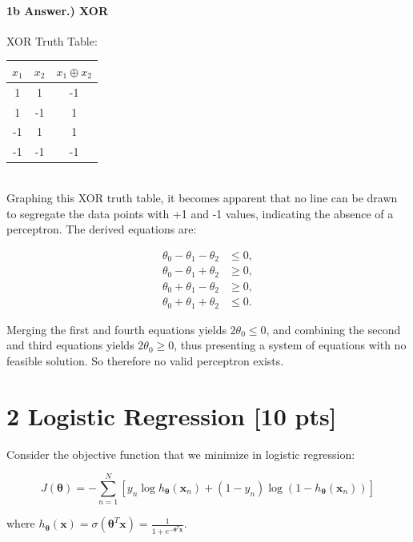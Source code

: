 \documentclass[10pt]{article}
\begin{document}
\paragraph{1b Answer.) XOR}
\hspace{1cm}

XOR Truth Table:\\
\begin{tabular}{cc|c}
$x_1$ & $x_2$ & $x_1 \oplus x_2$ \\ \hline
1 & 1 & -1 \\
1 & -1 & 1 \\
-1 & 1 & 1 \\
-1 & -1 & -1 \\
\end{tabular}\\

Graphing this XOR truth table, it becomes apparent that no line can be drawn to segregate the data points with +1 and -1 values, indicating the absence of a perceptron. The derived equations are:

\[
\begin{aligned}
\theta_0 - \theta_1 - \theta_2 &\leq 0, \\
\theta_0 - \theta_1 + \theta_2 &\geq 0, \\
\theta_0 + \theta_1 - \theta_2 &\geq 0, \\
\theta_0 + \theta_1 + \theta_2 &\leq 0.
\end{aligned}
\]

Merging the first and fourth equations yields \(2\theta_0 \leq 0\), and combining the second and third equations yields \(2\theta_0 \geq 0\), thus presenting a system of equations with no feasible solution. So therefore no valid perceptron exists.



\section*{2 Logistic Regression [10 pts]}
Consider the objective function that we minimize in logistic regression:

$$
J(\boldsymbol{\theta})=-\sum_{n=1}^{N}\left[y_{n} \log h_{\boldsymbol{\theta}}\left(\boldsymbol{x}_{n}\right)+\left(1-y_{n}\right) \log \left(1-h_{\boldsymbol{\theta}}\left(\boldsymbol{x}_{n}\right)\right)\right]
$$

where $h_{\boldsymbol{\theta}}(\boldsymbol{x})=\sigma\left(\boldsymbol{\theta}^{T} \boldsymbol{x}\right)=\frac{1}{1+e^{-\boldsymbol{\theta}^{T} \boldsymbol{x}}}$.
\end{document}
